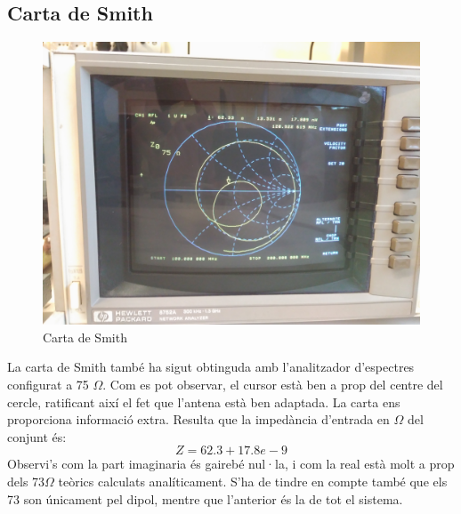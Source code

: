 \subsection{Carta de Smith}
\begin{figure}[H]
	\centering
	\includegraphics[width=\textwidth]{./images/Mesures/4smith.jpg}
	\caption{Carta de Smith}
	\label{smith}
\end{figure}
La carta de Smith també ha sigut obtinguda amb l'analitzador d'espectres configurat a 75 $\Omega$. Com es pot observar, el cursor està ben a prop del centre del cercle, ratificant així el fet que l'antena està ben adaptada.
La carta ens proporciona informació extra. Resulta que la impedància d'entrada en $\Omega$ del conjunt és:
\begin{equation}
Z = 62.3 + 17.8e-9	
\end{equation}
Observi's com la part imaginaria és gairebé nul·la, i com la real està molt a prop dels 73$\Omega$ teòrics calculats analíticament. S'ha de tindre en compte també que els 73 son únicament pel dipol, mentre que l'anterior és la de tot el sistema.
